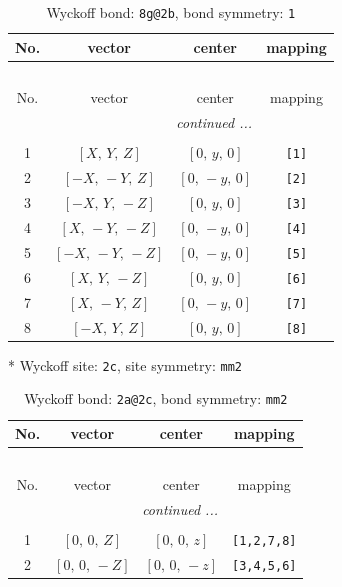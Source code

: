 \documentclass[fleqn,8pt]{jsarticle}
\begin{document}
\begin{longtable}{cccc}
\caption{Wyckoff bond: {\tt 8g@2b}, bond symmetry: {\tt 1}}
 \\
 \hline \hline
No. & vector & center & mapping \\ \hline \endfirsthead

\multicolumn{3}{l}{\tablename\ \thetable{}} \\
 \hline \hline
No. & vector & center & mapping \\ \hline \endhead

 \hline \hline
\multicolumn{3}{r}{\footnotesize\it continued ...} \\ \endfoot

 \hline \hline
\multicolumn{3}{r}{} \\ \endlastfoot

1 & $\left[ X,\, Y,\, Z \right]$ & $\left[ 0,\, y,\, 0 \right]$ & {\tt [1]} \\ \hline
2 & $\left[ - X,\, - Y,\, Z \right]$ & $\left[ 0,\, - y,\, 0 \right]$ & {\tt [2]} \\ \hline
3 & $\left[ - X,\, Y,\, - Z \right]$ & $\left[ 0,\, y,\, 0 \right]$ & {\tt [3]} \\ \hline
4 & $\left[ X,\, - Y,\, - Z \right]$ & $\left[ 0,\, - y,\, 0 \right]$ & {\tt [4]} \\ \hline
5 & $\left[ - X,\, - Y,\, - Z \right]$ & $\left[ 0,\, - y,\, 0 \right]$ & {\tt [5]} \\ \hline
6 & $\left[ X,\, Y,\, - Z \right]$ & $\left[ 0,\, y,\, 0 \right]$ & {\tt [6]} \\ \hline
7 & $\left[ X,\, - Y,\, Z \right]$ & $\left[ 0,\, - y,\, 0 \right]$ & {\tt [7]} \\ \hline
8 & $\left[ - X,\, Y,\, Z \right]$ & $\left[ 0,\, y,\, 0 \right]$ & {\tt [8]} \\
\end{longtable}
* Wyckoff site: {\tt 2c}, site symmetry: {\tt mm2}
\renewcommand{\arraystretch}{1.2}
\begin{longtable}{cccc}
\caption{Wyckoff bond: {\tt 2a@2c}, bond symmetry: {\tt mm2}}
 \\
 \hline \hline
No. & vector & center & mapping \\ \hline \endfirsthead

\multicolumn{3}{l}{\tablename\ \thetable{}} \\
 \hline \hline
No. & vector & center & mapping \\ \hline \endhead

 \hline \hline
\multicolumn{3}{r}{\footnotesize\it continued ...} \\ \endfoot

 \hline \hline
\multicolumn{3}{r}{} \\ \endlastfoot

1 & $\left[ 0,\, 0,\, Z \right]$ & $\left[ 0,\, 0,\, z \right]$ & {\tt [1,2,7,8]} \\ \hline
2 & $\left[ 0,\, 0,\, - Z \right]$ & $\left[ 0,\, 0,\, - z \right]$ & {\tt [3,4,5,6]} \\
\end{longtable}
\end{document}

